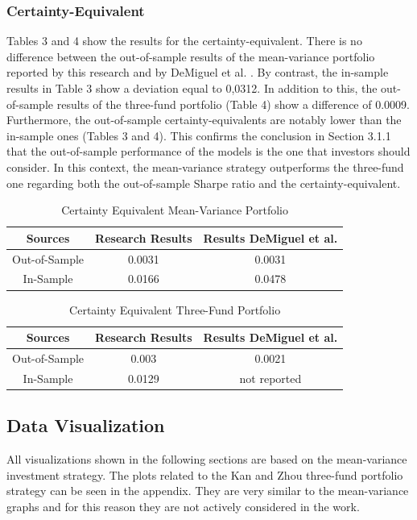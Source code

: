 \documentclass{article}
\begin{document}
\subsubsection{Certainty-Equivalent}
Tables 3 and 4 show the results for the certainty-equivalent. There is no difference between the out-of-sample results of the mean-variance portfolio reported by this research and by DeMiguel et al. \cite{DEM09}. By contrast, the in-sample results in Table 3 show a deviation equal to 0,0312. In addition to this, the out-of-sample results of the three-fund portfolio (Table 4) show a difference of 0.0009. Furthermore, the out-of-sample certainty-equivalents are notably lower than the in-sample ones (Tables 3 and 4). This confirms the conclusion in Section 3.1.1 that the out-of-sample performance of the models is the one that investors should consider. In this context, the mean-variance strategy outperforms the three-fund one regarding both the out-of-sample Sharpe ratio and the certainty-equivalent.

\begin{table}[H]
\begin{center}
\begin{tabular}{ccc}
\hline \hline
Sources & Research Results & Results DeMiguel et al. \cite{DEM09}\\
\hline
Out-of-Sample & 0.0031  &  0.0031 \\
In-Sample & 0.0166 & 0.0478\\
\hline \hline
\end{tabular}
\caption {Certainty Equivalent Mean-Variance Portfolio}
\end{center}
\end{table}

\begin{table}[H]
\begin{center}
\begin{tabular}{ccc}
\hline \hline
Sources & Research Results & Results DeMiguel et al. \cite{DEM09}\\
\hline
Out-of-Sample & 0.003  &  0.0021 \\
In-Sample & 0.0129 & not reported\\
\hline \hline
\end{tabular}
\caption {Certainty Equivalent Three-Fund Portfolio}
\end{center}
\end{table}

\subsection{Data Visualization}
All visualizations shown in the following sections are based on the mean-variance investment strategy. The plots related to the Kan and Zhou three-fund portfolio strategy can be seen in the appendix. They are very similar to the mean-variance graphs and for this reason they are not actively considered in the work.
\end{document}
